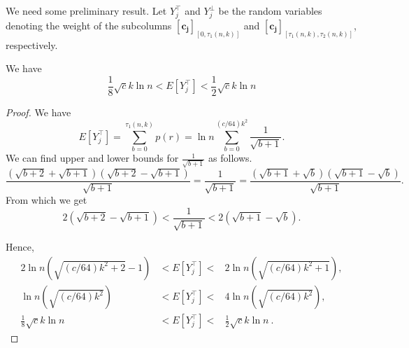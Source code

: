 \documentclass[11pt]{article}
\begin{document}
We need some preliminary result.
Let $Y^{\top}_j$ and $Y^{\perp}_j$ be the random variables denoting the weight of the  
subcolumns $\mathbf{[c_j]}_{[0, \tau_1(n,k)]}$ and 
$\mathbf{[c_j]}_{[\tau_1(n,k), \tau_2(n,k)]}$, respectively. 
\begin{lemma}\label{Eup}
We have
\[
 \frac{1}{8}  \sqrt{c} k \ln n          
         < E[Y^{\top}_j] < 
         \frac{1}{2}  \sqrt{c} k \ln n
 \]
\end{lemma}
\begin{proof}
We have 
\[
	E[Y^{\top}_j]   =     \sum_{b=0}^{\tau_1(n,k)} p(r) 
	                =    \ln n \sum_{b=0}^{(c/ 64) k^2} \frac{1}{\sqrt{b+1}} .
\]
We can find upper and lower bounds for $\frac{1}{\sqrt{b+1}}$ as follows.
\[
\frac{\left( \sqrt{b+2} + \sqrt{b+1} \right)
	\left( \sqrt{b+2} - \sqrt{b+1} \right)}{\sqrt{b+1}} 
 = \frac{1}{\sqrt{b+1}} =
\frac{\left( \sqrt{b+1} + \sqrt{b} \right)\left( \sqrt{b+1} - \sqrt{b} \right)}{\sqrt{b+1}}.
\]
From which we get
\begin{equation}\label{ineqs}
     2\left( \sqrt{b+2} - \sqrt{b+1} \right) < \frac{1}{\sqrt{b+1}} < 2\left( \sqrt{b+1} - \sqrt{b} \right).
\end{equation}

Hence,
\begin{eqnarray*}          
2\ln n \left( \sqrt{(c/64)  k^2 + 2} - 1 \right)  
        & < E[Y^{\top}_j] <
        & 2  \ln n \left( \sqrt{(c/64)  k^2+1} \right), \\
\ln n \left( \sqrt{(c/64) k^2} \right)	      
        & < E[Y^{\top}_j] < 
        & 4  \ln n \left( \sqrt{(c/64) k^2} \right), \\            
\frac{1}{8}  \sqrt{c} k \ln n          
        & < E[Y^{\top}_j] < 
        & \frac{1}{2}  \sqrt{c} k \ln n \ .
\end{eqnarray*}

\end{proof}
\end{document}

